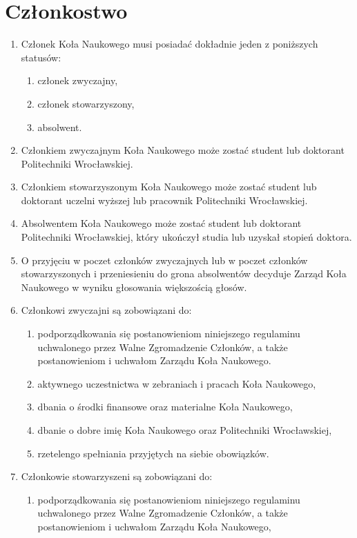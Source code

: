 \documentclass[12pt,a4paper]{article}
\begin{document}
\section{Członkostwo}
\begin{enumerate}
    \item Członek Koła Naukowego musi posiadać dokładnie jeden z poniższych statusów:    
        \begin{enumerate}
            \item członek zwyczajny,
            \item członek stowarzyszony,
            \item absolwent.
        \end{enumerate}
    \item Członkiem zwyczajnym Koła Naukowego może zostać student lub doktorant Politechniki Wrocławskiej.
    \item Członkiem stowarzyszonym Koła Naukowego może zostać student lub doktorant uczelni wyższej lub pracownik Politechniki Wrocławskiej.
    \item Absolwentem Koła Naukowego może zostać student lub doktorant Politechniki Wrocławskiej, który ukończył studia lub uzyskał stopień doktora.
    \item O przyjęciu w poczet członków zwyczajnych lub w poczet członków stowarzyszonych i przeniesieniu do grona absolwentów decyduje Zarząd Koła Naukowego w wyniku głosowania większością głosów.
    \item Członkowi zwyczajni są zobowiązani do: 
        \begin{enumerate}
            \item podporządkowania się postanowieniom niniejszego regulaminu uchwalonego przez Walne Zgromadzenie Członków,
            a także postanowieniom i uchwałom Zarządu Koła Naukowego.
            \item aktywnego uczestnictwa w zebraniach i pracach Koła Naukowego,
            \item dbania o środki finansowe oraz materialne Koła Naukowego,
            \item dbanie o dobre imię Koła Naukowego oraz Politechniki Wrocławskiej,
            \item rzetelengo spełniania przyjętych na siebie obowiązków.
        \end{enumerate}
    \item Członkowie stowarzyszeni są zobowiązani do:
        \begin{enumerate}
            \item podporządkowania się postanowieniom niniejszego regulaminu uchwalonego przez Walne Zgromadzenie Członków, a także postanowieniom i uchwałom Zarządu Koła Naukowego,

\end{enumerate}
\end{enumerate}
\end{document}
